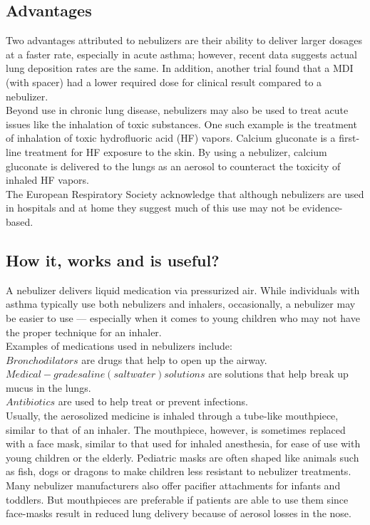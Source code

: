 \documentclass[12pt]{article}
\begin{document}
\subsection{Advantages}
Two advantages attributed to nebulizers are their ability to deliver larger dosages at a faster rate, especially in acute asthma; however, recent data suggests actual lung deposition rates are the same. In addition, another trial found that a MDI (with spacer) had a lower required dose for clinical result compared to a nebulizer.\\
Beyond use in chronic lung disease, nebulizers may also be used to treat acute issues like the inhalation of toxic substances. One such example is the treatment of inhalation of toxic hydrofluoric acid (HF) vapors. Calcium gluconate is a first-line treatment for HF exposure to the skin. By using a nebulizer, calcium gluconate is delivered to the lungs as an aerosol to counteract the toxicity of inhaled HF vapors.\\
The European Respiratory Society acknowledge that although nebulizers are used in hospitals and at home they suggest much of this use may not be evidence-based.



\subsection{How it, works and is useful?}
A nebulizer delivers liquid medication via pressurized air. While individuals with asthma typically use both nebulizers and inhalers, occasionally, a  nebulizer may be easier to use — especially when it comes to young children who may not have the proper technique for an inhaler.\\
Examples of medications used in nebulizers include:\\
$Bronchodilators$ are drugs that help to open up the airway.
$Medical-grade saline (saltwater) solutions$ are solutions that help break up mucus in the lungs.\\
$Antibiotics$ are used to help treat or prevent infections.\\
Usually, the aerosolized medicine is inhaled through a tube-like mouthpiece, similar to that of an inhaler. The mouthpiece, however, is sometimes replaced with a face mask, similar to that used for inhaled anesthesia, for ease of use with young children or the elderly. Pediatric masks are often shaped like animals such as fish, dogs or dragons to make children less resistant to nebulizer treatments. Many nebulizer manufacturers also offer pacifier attachments for infants and toddlers. But mouthpieces are preferable if patients are able to use them since face-masks result in reduced lung delivery because of aerosol losses in the nose.
\end{document}
